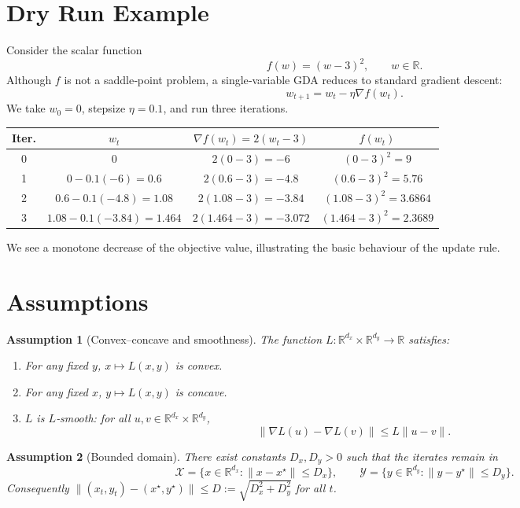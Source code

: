 \documentclass{article}
\newtheorem{assumption}{Assumption}
\newcommand{\R}{\mathbb{R}}
\begin{document}
\section*{Dry Run Example}
Consider the scalar function 
\[
    f(w) = (w-3)^2, \qquad w\in\R .
\]
Although $f$ is not a saddle‑point problem, a single‑variable GDA reduces to standard gradient descent:
\[
    w_{t+1}=w_t-\eta \nabla f(w_t).
\]
We take $w_0=0$, stepsize $\eta=0.1$, and run three iterations.

\begin{center}
\begin{tabular}{c|c|c|c}
\textbf{Iter.} & $w_t$ & $\nabla f(w_t)=2(w_t-3)$ & $f(w_t)$\\ \hline
0 & $0$ & $2(0-3)=-6$ & $(0-3)^2=9$\\
1 & $0-0.1(-6)=0.6$ & $2(0.6-3)=-4.8$ & $(0.6-3)^2=5.76$\\
2 & $0.6-0.1(-4.8)=1.08$ & $2(1.08-3)=-3.84$ & $(1.08-3)^2=3.6864$\\
3 & $1.08-0.1(-3.84)=1.464$ & $2(1.464-3)=-3.072$ & $(1.464-3)^2=2.3689$\\
\end{tabular}
\end{center}
We see a monotone decrease of the objective value, illustrating the basic behaviour of the update rule.

\newpage
\section*{Assumptions}
\begin{assumption}[Convex–concave and smoothness]\label{as:cc}
The function $L:\R^{d_x}\times\R^{d_y}\rightarrow\R$ satisfies:
\begin{enumerate}
    \item For any fixed $y$, $x\mapsto L(x,y)$ is convex.
    \item For any fixed $x$, $y\mapsto L(x,y)$ is concave.
    \item $L$ is $L$‑smooth: for all $u,v\in\R^{d_x}\times\R^{d_y}$,
    \[
        \big\|\nabla L(u)-\nabla L(v)\big\| \le L\|u-v\|.
    \]
\end{enumerate}
\end{assumption}

\begin{assumption}[Bounded domain]\label{as:bounded}
There exist constants $D_x,D_y>0$ such that the iterates remain in
\[
    \mathcal{X}=\{x\in\R^{d_x}:\|x-x^\star\|\le D_x\},\qquad
    \mathcal{Y}=\{y\in\R^{d_y}:\|y-y^\star\|\le D_y\}.
\]
Consequently $\| (x_t,y_t)-(x^\star,y^\star)\|\le D:=\sqrt{D_x^2+D_y^2}$ for all $t$.
\end{assumption}
\end{document}
